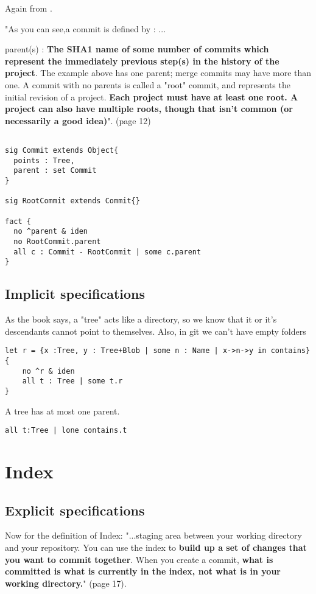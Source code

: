 Again from \cite{gitComm}. \par 
"As you can see,a commit is defined by :
... \par
parent(s) : {\bf The SHA1 name of some number of commits which
represent the immediately previous step(s) in the 
history of the project}. The example above has one parent;
merge commits may have more than one. A commit with no 
parents is called a "root" commit, and represents the 
initial revision of a project. {\bf Each project must have at
least one root. A project can also have multiple roots,
though that isn't common (or necessarily a good idea)}". (page 12)

\begin{lstlisting}

sig Commit extends Object{
  points : Tree,
  parent : set Commit
}

sig RootCommit extends Commit{}

fact {
  no ^parent & iden
  no RootCommit.parent
  all c : Commit - RootCommit | some c.parent	
}

\end{lstlisting}


\subsection{Implicit specifications}

As the book \cite{gitComm} says, a "tree" acts
like a directory, so we know that it or it's 
descendants cannot point to themselves.
Also, in git we can't have empty folders 

\begin{lstlisting}
let r = {x :Tree, y : Tree+Blob | some n : Name | x->n->y in contains} {
	no ^r & iden
	all t : Tree | some t.r
}
\end{lstlisting}

A tree has at most one parent.
\begin{lstlisting}
all t:Tree | lone contains.t
\end{lstlisting}

\section{Index}

\subsection{Explicit specifications}

Now for the definition of Index:
"...staging area between your working directory and your
repository. You can use the index to {\bf build up a set of 
changes that you want to commit together}. When you create
a commit, {\bf what is committed is what is currently in the
index, not what is in your working directory.}"
\cite{gitComm} (page 17). \par

